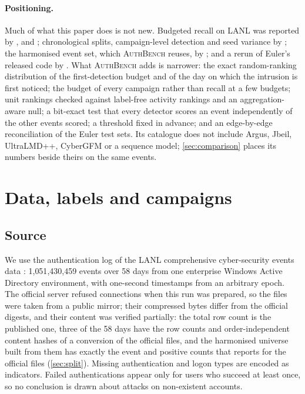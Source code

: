 \documentclass[11pt,a4paper]{article}
\newcommand{\AuthBench}{\textsc{AuthBench}}
\begin{document}
\paragraph{Positioning.}
Much of what this paper does is not new. Budgeted recall on LANL was reported by \textcite{garchery2020adsage}, \textcite{larroche2021decades} and \textcite{larroche2025ultralmd}; chronological splits, campaign-level detection and seed variance by \textcite{zhao2026gids}; the harmonised event set, which \AuthBench{} reuses, by \textcite{larroche2026fair}; and a rerun of Euler's released code by \textcite{wang2025rr}. What \AuthBench{} adds is narrower: the exact random-ranking distribution of the first-detection budget and of the day on which the intrusion is first noticed; the budget of every campaign rather than recall at a few budgets; unit rankings checked against label-free activity rankings and an aggregation-aware null; a bit-exact test that every detector scores an event independently of the other events scored; a threshold fixed in advance; and an edge-by-edge reconciliation of the Euler test sets. Its catalogue does not include Argus, Jbeil, UltraLMD++, CyberGFM or a sequence model; \cref{sec:comparison} places its numbers beside theirs on the same events.

\section{Data, labels and campaigns}
\label{sec:data}

\subsection{Source}
We use the authentication log of the LANL comprehensive cyber-security events data \parencite{kent2015dataset}: 1{,}051{,}430{,}459 events over 58 days from one enterprise Windows Active Directory environment, with one-second timestamps from an arbitrary epoch. The official server refused connections when this run was prepared, so the files were taken from a public mirror; their compressed bytes differ from the official digests, and their content was verified partially: the total row count is the published one, three of the 58 days have the row counts and order-independent content hashes of a conversion of the official files, and the harmonised universe built from them has exactly the event and positive counts that \textcite[Table~4]{larroche2026fair} reports for the official files (\cref{sec:split}). Missing authentication and logon types are encoded as indicators. Failed authentications appear only for users who succeed at least once, so no conclusion is drawn about attacks on non-existent accounts.
\end{document}
